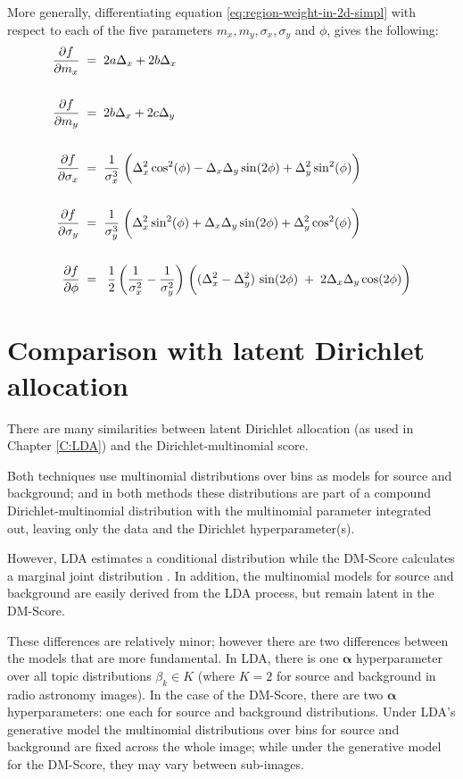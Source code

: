 More generally, differentiating equation
\ref{eq:region-weight-in-2d-simpl} with respect to each of the five
parameters $m_x, m_y, \sigma_x, \sigma_y$ and $\phi$, gives the
following:
\begin{align}
\frac{\partial f}{\partial m_x} \; &= \; 2a\Delta_x + 2b\Delta_x \\ \notag\\ 
\frac{\partial f}{\partial m_y} \; &= \; 2b\Delta_x + 2c\Delta_y \\ \notag\\ 
\frac{\partial f}{\partial \sigma_x} \; &= \;
\frac{1}{\sigma_x^3} \; \bigg( \Delta_x^2\cos^2(\phi) -
\Delta_x\Delta_y\sin(2\phi) + \Delta_y^2\sin^2(\phi) \bigg)\\ \notag\\ 
\frac{\partial f}{\partial \sigma_y} \; &= \;
\frac{1}{\sigma_y^3} \; \bigg( \Delta_x^2\sin^2(\phi) +
\Delta_x\Delta_y\sin(2\phi) + \Delta_y^2\cos^2(\phi) \bigg) \\ \notag\\ 
\frac{\partial f}{\partial \phi} \; &= \; \;
\frac{1}{2} \,\bigg( \frac{1}{\sigma_x^2} - \frac{1}{\sigma_y^2}
 \bigg) \;
\bigg(  
(\Delta_x^2 - \Delta_y^2) \, \sin(2\phi) \; + \; 2 \Delta_x \Delta_y \cos(2\phi)
 \bigg)
\end{align}

\section{Comparison with latent Dirichlet allocation}\label{sec:comp-lda}
There are many similarities between latent Dirichlet allocation (as used in Chapter \ref{C:LDA}) and the Dirichlet-multinomial score.

Both techniques use multinomial distributions over bins as models for source and background; and in both methods these distributions are part of a compound Dirichlet-multinomial distribution with the multinomial parameter integrated out, leaving only the data and the Dirichlet hyperparameter(s).

However, LDA estimates a conditional distribution while the DM-Score calculates a marginal joint distribution \cite{blei2003latent, ng2011dirichlet}. In addition, the multinomial models for source and background are easily derived from the LDA process, but remain latent in the DM-Score. 

These differences are relatively minor; however there are two differences between the models that are more fundamental. In LDA, there is one $\boldsymbol{\alpha}$ hyperparameter over all topic distributions $\beta_k \in K$ (where $K=2$ for source and background in radio astronomy images). In the case of the DM-Score, there are two $\boldsymbol{\alpha}$ hyperparameters: one each for source and background distributions. Under LDA's generative model the multinomial distributions over bins for source and background are fixed across the whole image; while under the generative model for the DM-Score, they may vary between sub-images.

